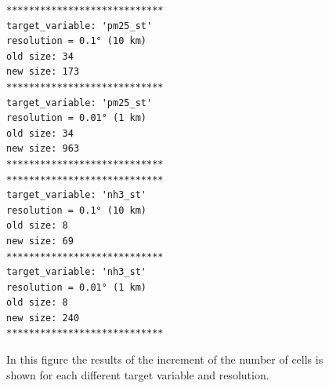\begin{figure}
\begin{multicols}{2}
\begin{verbatim}
****************************
target_variable: 'pm25_st'
resolution = 0.1° (10 km)
old size: 34
new size: 173 
****************************
target_variable: 'pm25_st'
resolution = 0.01° (1 km)
old size: 34
new size: 963 
****************************
****************************
target_variable: 'nh3_st'
resolution = 0.1° (10 km)
old size: 8
new size: 69 
****************************
target_variable: 'nh3_st'
resolution = 0.01° (1 km)
old size: 8
new size: 240 
****************************
\end{verbatim}
\end{multicols}
\caption{In this figure the results of the increment of the number of cells is shown for each different target variable and resolution.}
\label{fig:cells}
\end{figure}

